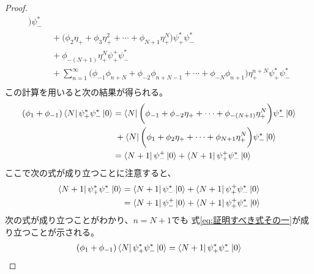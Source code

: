 {\begin{proof}
\begin{equation*}
\begin{split}
				\biggr)\psi_-^* \\
			&\; + \biggl(\phi_2\eta_+ + \phi_3\eta_+^2
				+\cdots+ \phi_{N+1}\eta_+^N\biggr)\psi_+^*\psi_-^*  \\
			&\; + \phi_{-(N+1)}\eta_+^N\psi_+^+\psi_-^* \\
			&\; + \sum_{n=1}^\infty \biggl(\phi_{-1}\phi_{n+N} 
				+ \phi_{-2}\phi_{n+N-1} +\cdots+ \phi_{-N}\phi_{n+1}\biggr)
				\eta_+^{n+N}\psi_+^*\psi_-^* \\
		\end{split}\end{equation*}
		この計算を用いると次の結果が得られる。
		\begin{equation*}\begin{split}
			(\phi_1 + \phi_{-1})\mathinner{\langle{N}|}\psi_+^*\psi_-^*\mathinner{|{0}\rangle}
			&= \mathinner{\langle{N}|}\biggl(\phi_{-1} + \phi_{-2}\eta_+
				+\cdots+ \phi_{-(N+1)}\eta_+^N\biggr)\psi_-^*\mathinner{|{0}\rangle} \\
			&\; + \mathinner{\langle{N}|}\biggl(\phi_1 + \phi_2\eta_+
				+\cdots+ \phi_{N+1}\eta_+^N\biggr)\psi_-^*\mathinner{|{0}\rangle} \\
			&= \mathinner{\langle{N+1}|}\psi_-^+\mathinner{|{0}\rangle}
				+ \mathinner{\langle{N+1}|}\psi_+^+\psi_-^*\mathinner{|{0}\rangle} \\
		\end{split}\end{equation*}
		ここで次の式が成り立つことに注意すると、
		\begin{equation*}\begin{split}
			\mathinner{\langle{N+1}|}\psi_+^*\psi_-^*\mathinner{|{0}\rangle} &= \mathinner{\langle{N+1}|}\psi_-^*\mathinner{|{0}\rangle}
				+ \mathinner{\langle{N+1}|}\psi_+^+\psi_-^*\mathinner{|{0}\rangle} \\
			&= \mathinner{\langle{N+1}|}\psi_-^+\mathinner{|{0}\rangle} + \mathinner{\langle{N+1}|}\psi_+^+\psi_-^*\mathinner{|{0}\rangle} \\
		\end{split}\end{equation*}
		次の式が成り立つことがわかり、$n=N+1$でも
		式\eqref{eq:証明すべき式その一}が成り立つことが示される。
		\begin{equation*}\begin{split}
			(\phi_1 + \phi_{-1})\mathinner{\langle{N}|}\psi_+^*\psi_-^*\mathinner{|{0}\rangle}
			= \mathinner{\langle{N+1}|}\psi_+^*\psi_-^*\mathinner{|{0}\rangle}
		\end{split}\end{equation*}
	\end{proof} %

}
